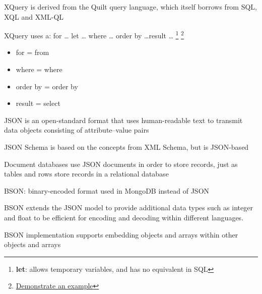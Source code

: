 \documentclass{beamer}
\begin{document}
\begin{slide}{
\item XQuery is derived from the Quilt query language, which itself borrows from SQL, XQL and XML-QL
\item XQuery uses a:    for … let … where … order by …result …  \footnote{  \textbf{let}: allows temporary variables, and has no equivalent in SQL}
\footnote{ \href{http://www.w3schools.com/xsl/xquery_flwor.asp}{Demonstrate an example}}
\begin{itemize}
	\item for			=	 from 
	\item where		=	 where
	\item order by	=	 order by
	\item result		=	 select
\end{itemize}
}\end{slide}

\begin{slide}{
\item JSON is an open-standard format that uses human-readable text to transmit data objects consisting of attribute–value pairs
\item JSON Schema is based on the concepts from XML Schema, but is JSON-based
\item Document databases use JSON documents in order to store records, just as tables and rows store records in a relational database
}\end{slide}

\begin{slide}{
\item BSON: binary-encoded format used in MongoDB instead of JSON
\item BSON extends the JSON model to provide additional data types such as integer and float to be efficient for encoding and decoding within different languages.
\item BSON implementation supports embedding objects and arrays within other objects and arrays
}\end{slide}
\end{document}

